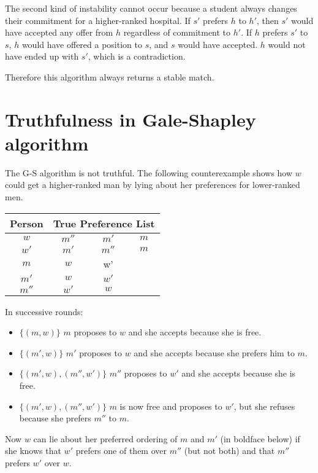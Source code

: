 \documentclass[12pt]{article}
\begin{document}
The second kind of instability cannot occur because a student always changes
their commitment for a higher-ranked hospital. If $s'$ prefers $h$ to $h'$,
then $s'$ would have accepted any offer from $h$ regardless of
commitment to $h'$. If $h$ prefers $s'$ to $s$, $h$ would have offered
a position to $s$, and $s$ would have accepted. $h$ would not have ended
up with $s'$, which is a contradiction.

Therefore this algorithm always returns a stable match.

\pagebreak

\setcounter{section}{1}
\section{Truthfulness in Gale-Shapley algorithm}

The G-S algorithm is not truthful. The following counterexample shows
how $w$ could get a higher-ranked man by lying about her preferences for
lower-ranked men.

\vspace{\baselineskip}
\begin{tabular}{|c|ccc|}
\hline
Person & \multicolumn{3}{c|}{True Preference List}\\
\hline
$w$ & $m''$ & $m'$ & $m$ \\
$w'$ & $m'$ & $m''$ & $m$ \\
$m$ & $w$ & w' & \\
$m'$ & $w$ & $w'$ & \\
$m''$ & $w'$ & $w$ & \\
\hline
\end{tabular}
\vspace{\baselineskip}

In successive rounds:
\begin{itemize}
\item
$\{(m,w)\}$ $m$ proposes to $w$ and she accepts because she is free.
\item
$\{(m',w)\}$ $m'$ proposes to $w$ and she accepts because she prefers
him to $m$.
\item
$\{(m',w),(m'',w')\}$ $m''$ proposes to $w'$ and she accepts because she is free.
\item
$\{(m',w),(m'',w')\}$ $m$ is now free and proposes to $w'$, but she refuses because she prefers $m''$ to $m$.
\end{itemize}

Now $w$ can lie about her preferred ordering of $m$ and $m'$ (in boldface
below) if she knows
that $w'$ prefers one of them over $m''$ (but not both) and that $m''$
prefers $w'$ over $w$.
\end{document}
